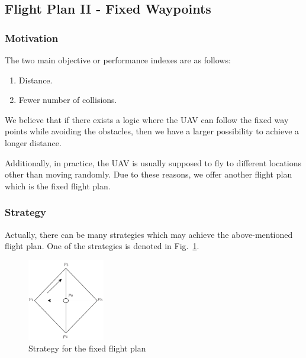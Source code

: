 \subsection{Flight Plan II - Fixed Waypoints}




\subsubsection{Motivation}
The two main objective or performance indexes are as follows:
\begin{enumerate}
\item Distance.
\item Fewer number of collisions.
\end{enumerate}

We believe that if there exists a logic where the \ac{UAV} can follow the fixed way points while avoiding the obstacles, then we have a larger possibility to achieve a longer distance. 

Additionally, in practice, the \ac{UAV} is usually supposed to fly to different locations other than moving randomly. Due to these reasons, we offer another flight plan which is the fixed flight plan.


\subsubsection{Strategy}
Actually, there can be many strategies which may achieve the above-mentioned flight plan. One of the strategies is denoted in Fig.~\ref{f:fp}.

\begin{figure}
\centering
\includegraphics[width= 0.3\textwidth]{Figures/fp}
\caption{Strategy for the fixed flight plan}
\label{f:fp}
\end{figure}

